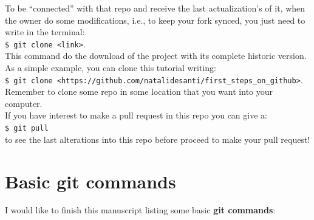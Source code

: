 \documentclass[12pt,a4paper,titlepage,brazil]{article}
\begin{document}
{To be ``connected'' with that repo and receive the last actualization's of it, when the owner do some modifications, i.e., to keep your fork synced, you just need to write in the terminal:\\

\texttt{\$ git clone <link>}.\\

This command do the download of the project with its complete historic version. As a simple example, you can clone this tutorial writing:\\

\texttt{\$ git clone <https://github.com/natalidesanti/first\_steps\_on\_github>}.\\

Remember to clone some repo in some location that you want into your computer.\\

If you have interest to make a pull request in this repo you can give a:\\

\texttt{\$ git pull}\\

to see the last alterations into this repo before proceed to make your pull request!


\section{Basic git commands}

I would like to finish this manuscript listing some basic {\bf git commands}:

}
\end{document}
